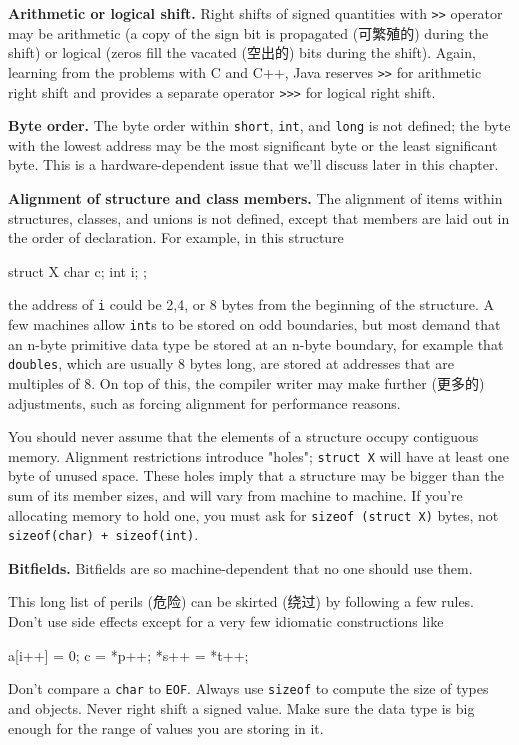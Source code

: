 \textbf{Arithmetic or logical shift.} Right shifts of signed quantities
with \verb'>>' operator may be arithmetic (a copy of the sign bit is
propagated (可繁殖的) during the shift) or logical (zeros fill the vacated
(空出的) bits during the shift). Again, learning from the problems with C
and C++, Java reserves \verb'>>' for arithmetic right shift and provides a
separate operator \verb'>>>' for logical right shift.

\textbf{Byte order.} The byte order within \verb'short', \verb'int', and
\verb'long' is not defined; the byte with the lowest address may be the
most significant byte or the least significant byte. This is a
hardware-dependent issue that we'll discuss later in this chapter.

\textbf{Alignment of structure and class members.} The alignment of items
within structures, classes, and unions is not defined, except that members
are laid out in the order of declaration. For example, in this structure
\begin{wellcode}
    struct X {
        char    c;
        int     i;
    };
\end{wellcode}
the address of \verb'i' could be 2,4, or 8 bytes from the beginning of the
structure. A few machines allow \verb'int's to be stored on odd boundaries,
but most demand that an n-byte primitive data type be stored at an n-byte
boundary, for example that \verb'doubles', which are usually 8 bytes long,
are stored at addresses that are multiples of 8.  On top of this, the
compiler writer may make further (更多的) adjustments, such as forcing
alignment for performance reasons.

You should never assume that the elements of a structure occupy contiguous
memory. Alignment restrictions introduce "holes"; \verb'struct X' will have
at least one byte of unused space. These holes imply that a structure may
be bigger than the sum of its member sizes, and will vary from machine to
machine. If you're allocating memory to hold one, you must ask for
\texttt{sizeof (struct X)} bytes, not \verb'sizeof(char) + sizeof(int)'.

\textbf{Bitfields.} Bitfields are so machine-dependent that no one should
use them.

This long list of perils (危险) can be skirted (绕过) by following a few
rules. Don't use side effects except for a very few idiomatic constructions
like
\begin{wellcode}
    a[i++] = 0;
    c = *p++;
    *s++ = *t++;
\end{wellcode}
Don't compare a \verb'char' to \verb'EOF'. Always use \verb'sizeof' to
compute the size of types and objects. Never right shift a signed value.
Make sure the data type is big enough for the range of values you are
storing in it.

